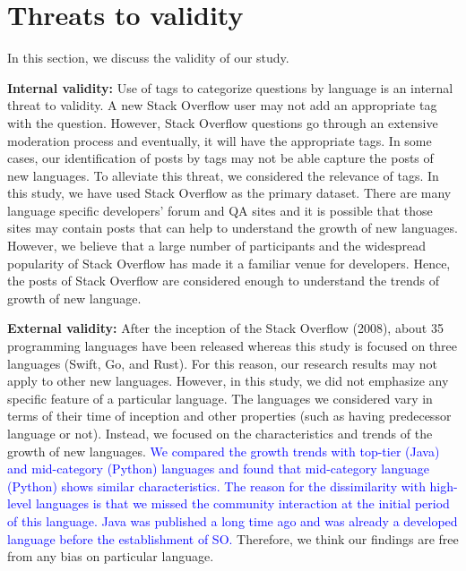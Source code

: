 \section{Threats to validity}
\label{sec:validity}
In this section, we discuss the validity of our study.

\indent \textbf{Internal validity:} Use of tags to categorize questions by language is an internal threat to validity. A new Stack Overflow user may not add an appropriate tag with the question. However, Stack Overflow questions go through an extensive moderation process and eventually, it will have the appropriate tags. In some cases, our identification of posts by tags may not be able capture the posts of new languages. To alleviate this threat, we considered the relevance of tags.  In this study, we have used Stack Overflow as the primary dataset. There are many language specific developers' forum and QA sites and it is possible that those sites may contain posts that can help to understand the growth of new languages. However, we believe that a large number of participants and the widespread popularity of Stack Overflow has made it a familiar venue for developers. Hence, the posts of Stack Overflow are considered enough to understand the trends of growth of new language.

\indent \textbf{External validity:} After the inception of the Stack Overflow (2008), about 35 programming languages have been released\citep{wiki:Timeline} whereas this study is focused on three languages (Swift, Go, and Rust). For this reason, our research results may not apply to other new languages. However, in this study, we did not emphasize any specific feature of a particular language. The languages we considered vary in terms of their time of inception and other properties (such as having predecessor language or not). Instead, we focused on the characteristics and trends of the growth of new languages. \textcolor{blue}{We compared the growth trends with top-tier (Java) and mid-category (Python) languages and found that mid-category language (Python) shows similar characteristics. The reason for the dissimilarity with high-level languages is that we missed the community interaction at the initial period of this language. Java was published a long time ago and was already a developed language before the establishment of SO.} Therefore, we think our findings are free from any bias on particular language.

\iffalse

\indent \textbf{Construct validity:} In this study, votes of accepted answers are given double weight in the calculation of post quality. The weight used may not represent their exact contribution. However, the magnitude of weight do not influence our analysis. Thus, double weight in the accepted answer will not invalidate our claim.
\fi